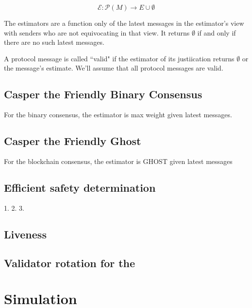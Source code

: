 \documentclass{article}
\theoremstyle{definition}
\begin{document}
$$
\mathcal{E}: \mathcal{P}(M) \to E\cup\emptyset
$$

The estimators are a function only of the latest messages in the estimator's view with senders who are not equivocating in that view. It returns $\emptyset$ if and only if there are no such latest messages.

A protocol message is called ``valid" if the estimator of its justiication returns $\emptyset$ or the message's estimate. We'll assume that all protocol messages are valid.

\subsection{Casper the Friendly Binary Consensus}

For the binary consensus, the estimator is max weight given latest messages.

\subsection{Casper the Friendly Ghost}

For the blockchain consensus, the estimator is GHOST given latest messages


\subsection{Efficient safety determination}

1.
2.
3.

\subsection{Liveness}

\subsection{Validator rotation for the }

\section{Simulation}


\fi



\iffalse
\end{document}
